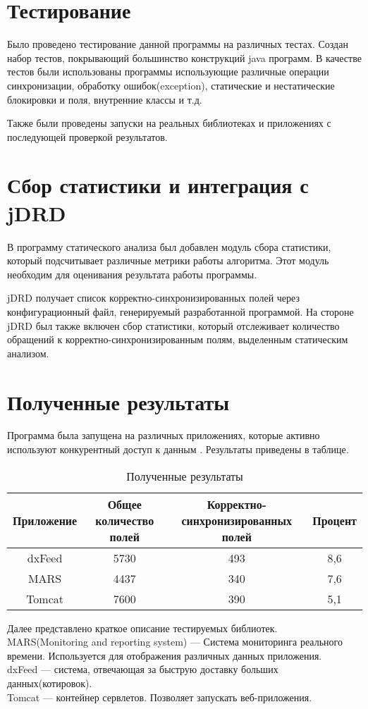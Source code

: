\FloatBarrier
\section{Тестирование}
Было проведено тестирование данной программы на различных тестах. Создан набор тестов, покрывающий большинство конструкций java программ. В качестве тестов были использованы программы использующие различные операции синхронизации, обработку ошибок(exception), статические и нестатические блокировки и поля, внутренние классы и т.д.

Также были проведены запуски на реальных библиотеках и приложениях с последующей проверкой результатов.

\FloatBarrier
\section{Сбор статистики и интеграция с jDRD}
В программу статического анализа был добавлен модуль сбора статистики, который подсчитывает различные метрики работы алгоритма. Этот модуль необходим для оценивания результата работы программы.

jDRD получает список корректно-синхронизированных полей через конфигурационный файл, генерируемый разработанной программой.
На стороне jDRD был также включен сбор статистики, который отслеживает количество обращений к корректно-синхронизированным полям, выделенным статическим анализом.


\section{Полученные результаты}
Программа была запущена на различных приложениях, которые активно используют конкурентный доступ к данным .  Результаты приведены в таблице. 

\begin{table}[H]
\label{results}
\begin{center}
\begin{tabular}{|c|c|c|c|}
\hline
Приложение & Общее количество полей & Корректно-синхронизированных полей & Процент \\
\hline
dxFeed & 5730 & 493 & 8,6 \\
\hline
MARS & 4437 & 340 & 7,6 \\
\hline
Tomcat & 7600 & 390 & 5,1 \\

\hline

\end{tabular}
\captionsetup{justification=centering}
\caption{Полученные результаты}
\end{center}
\end{table}
Далее представлено краткое описание тестируемых библиотек.
\\MARS(Monitoring and reporting system) --- Система мониторинга реального времени. Используется для отображения различных данных приложения. 
\\ dxFeed --- система, отвечающая за быструю доставку больших данных(котировок).
\\ Tomcat --- контейнер сервлетов. Позволяет запускать веб-приложения.

